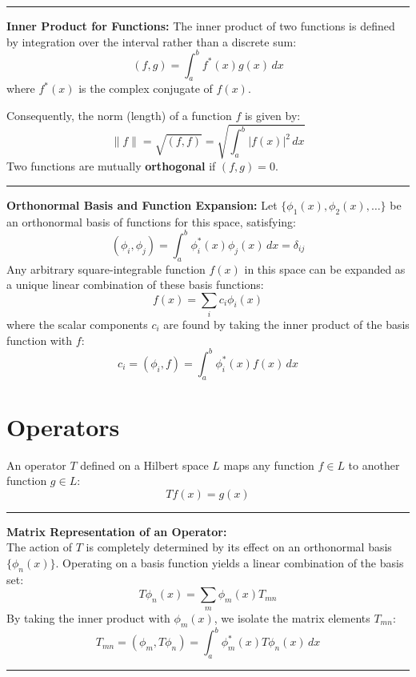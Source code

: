 \documentclass[11pt, a4paper]{report}
\begin{document}
\vspace{1em}
\hrule
\vspace{1em}

\textbf{Inner Product for Functions:}
The inner product of two functions is defined by integration over the interval rather than a discrete sum:
\[ (f, g) = \int_a^b f^*(x) g(x) \, dx \]
where $f^*(x)$ is the complex conjugate of $f(x)$.

Consequently, the norm (length) of a function $f$ is given by:
\[ \|f\| = \sqrt{(f, f)} = \sqrt{\int_a^b |f(x)|^2 \, dx} \]
Two functions are mutually \textbf{orthogonal} if $(f, g) = 0$.

\vspace{1em}
\hrule
\vspace{1em}

\textbf{Orthonormal Basis and Function Expansion:}
Let $\{\phi_1(x), \phi_2(x), \dots \}$ be an orthonormal basis of functions for this space, satisfying:
\[ (\phi_i, \phi_j) = \int_a^b \phi_i^*(x) \phi_j(x) \, dx = \delta_{ij} \]
Any arbitrary square-integrable function $f(x)$ in this space can be expanded as a unique linear combination of these basis functions:
\[ f(x) = \sum_{i} c_i \phi_i(x) \]
where the scalar components $c_i$ are found by taking the inner product of the basis function with $f$:
\[ c_i = (\phi_i, f) = \int_a^b \phi_i^*(x) f(x) \, dx \]


\section{Operators}

An operator $T$ defined on a Hilbert space $L$ maps any function $f \in L$ to another function $g \in L$:
\[ T f(x) = g(x) \]

\vspace{1em}
\hrule
\vspace{1em}

\textbf{Matrix Representation of an Operator:}\\
The action of $T$ is completely determined by its effect on an orthonormal basis $\{\phi_n(x)\}$. Operating on a basis function yields a linear combination of the basis set:
\[ T \phi_n(x) = \sum_m \phi_m(x) T_{mn} \]
By taking the inner product with $\phi_m(x)$, we isolate the matrix elements $T_{mn}$:
\[ T_{mn} = (\phi_m, T \phi_n) = \int_a^b \phi_m^*(x) T \phi_n(x) \, dx \]

\vspace{1em}
\hrule
\vspace{1em}
\end{document}

